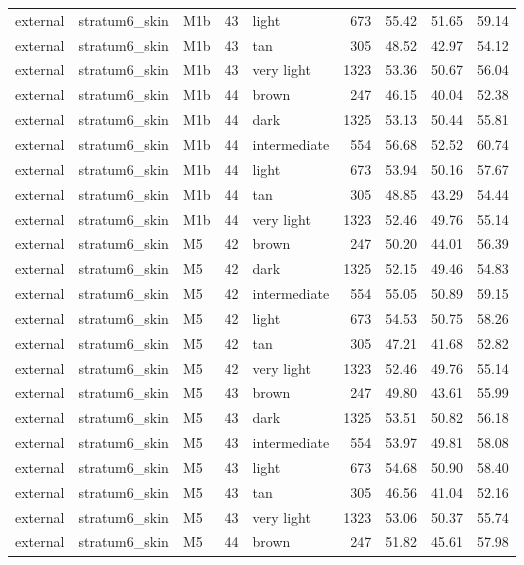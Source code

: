 \begin{tabular}{lllrlrrrr}
external & stratum6\_skin & M1b & 43 & light & 673 & 55.42 & 51.65 & 59.14 \\
external & stratum6\_skin & M1b & 43 & tan & 305 & 48.52 & 42.97 & 54.12 \\
external & stratum6\_skin & M1b & 43 & very light & 1323 & 53.36 & 50.67 & 56.04 \\
external & stratum6\_skin & M1b & 44 & brown & 247 & 46.15 & 40.04 & 52.38 \\
external & stratum6\_skin & M1b & 44 & dark & 1325 & 53.13 & 50.44 & 55.81 \\
external & stratum6\_skin & M1b & 44 & intermediate & 554 & 56.68 & 52.52 & 60.74 \\
external & stratum6\_skin & M1b & 44 & light & 673 & 53.94 & 50.16 & 57.67 \\
external & stratum6\_skin & M1b & 44 & tan & 305 & 48.85 & 43.29 & 54.44 \\
external & stratum6\_skin & M1b & 44 & very light & 1323 & 52.46 & 49.76 & 55.14 \\
external & stratum6\_skin & M5 & 42 & brown & 247 & 50.20 & 44.01 & 56.39 \\
external & stratum6\_skin & M5 & 42 & dark & 1325 & 52.15 & 49.46 & 54.83 \\
external & stratum6\_skin & M5 & 42 & intermediate & 554 & 55.05 & 50.89 & 59.15 \\
external & stratum6\_skin & M5 & 42 & light & 673 & 54.53 & 50.75 & 58.26 \\
external & stratum6\_skin & M5 & 42 & tan & 305 & 47.21 & 41.68 & 52.82 \\
external & stratum6\_skin & M5 & 42 & very light & 1323 & 52.46 & 49.76 & 55.14 \\
external & stratum6\_skin & M5 & 43 & brown & 247 & 49.80 & 43.61 & 55.99 \\
external & stratum6\_skin & M5 & 43 & dark & 1325 & 53.51 & 50.82 & 56.18 \\
external & stratum6\_skin & M5 & 43 & intermediate & 554 & 53.97 & 49.81 & 58.08 \\
external & stratum6\_skin & M5 & 43 & light & 673 & 54.68 & 50.90 & 58.40 \\
external & stratum6\_skin & M5 & 43 & tan & 305 & 46.56 & 41.04 & 52.16 \\
external & stratum6\_skin & M5 & 43 & very light & 1323 & 53.06 & 50.37 & 55.74 \\
external & stratum6\_skin & M5 & 44 & brown & 247 & 51.82 & 45.61 & 57.98 \\

\end{tabular}
